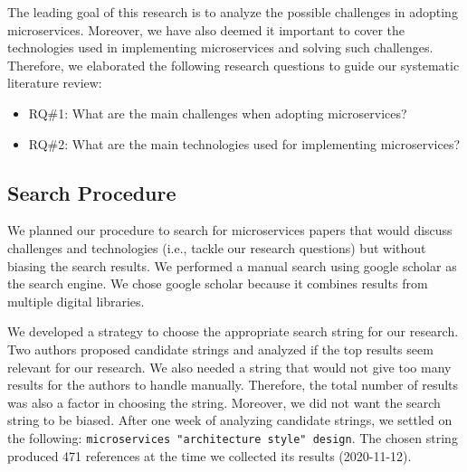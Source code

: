 The leading goal of this research is to analyze the possible challenges in adopting microservices. Moreover, we have also deemed it important to cover the technologies used in implementing microservices and solving such challenges. Therefore, we elaborated the following research questions to guide our systematic literature review:

\begin{itemize}
  \item RQ\#1: What are the main challenges when adopting microservices?
  \item RQ\#2: What are the main technologies used for implementing microservices?
\end{itemize}


\subsection{Search Procedure}

We planned our procedure to search for microservices papers that would discuss challenges and technologies (i.e., tackle our research questions) but without biasing the search results. 
We performed a manual search using google scholar as the search engine. 
We chose google scholar because it combines results from multiple digital libraries. 

We developed a strategy to choose the appropriate search string for our research. Two authors proposed candidate strings and analyzed if the top results seem relevant for our research. We also needed a string that would not give too many results for the authors to handle manually. Therefore, the total number of results was also a factor in choosing the string. Moreover, we did not want the search string to be biased. After one week of analyzing candidate strings, we settled on the following: \texttt{microservices "architecture style" design}. The chosen string produced 471 references at the time we collected its results (2020-11-12). 



